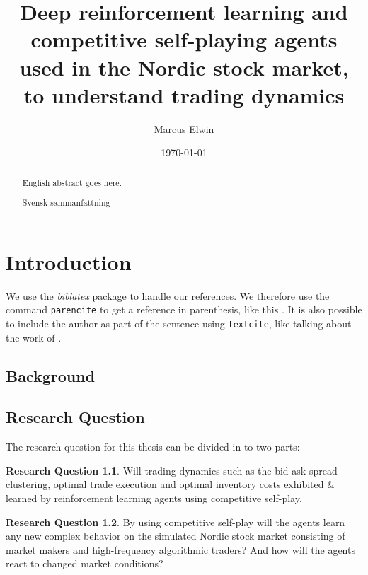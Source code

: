 \documentclass{kththesis}
\title{Deep reinforcement learning and competitive self-playing agents used in the Nordic stock market, to understand trading dynamics}
\author{Marcus Elwin}
\date{\today}
\theoremstyle{definition}
\newtheorem{RQ}{Research Question}[section]
\begin{document}
\frontmatter

\titlepage

\begin{abstract}
  English abstract goes here.

  \blindtext
\end{abstract}


\begin{otherlanguage}{swedish}
  \begin{abstract}
    Svensk sammanfattning
  \end{abstract}
\end{otherlanguage}


\tableofcontents


\mainmatter


\chapter{Introduction}

We use the \emph{biblatex} package to handle our references.  We therefore use the
command \texttt{parencite} to get a reference in parenthesis, like this
\parencite{heisenberg2015}.  It is also possible to include the author
as part of the sentence using \texttt{textcite}, like talking about
the work of \textcite{einstein2016}.

\section{Background}

\section{Research Question}
The research question for this thesis can be divided in to two parts:

\begin{RQ}
Will trading dynamics such as the bid-ask spread clustering, optimal trade execution and optimal inventory costs exhibited \& learned by reinforcement learning agents using competitive self-play.
\end{RQ}

\begin{RQ}
By using competitive self-play will the agents learn any new complex behavior on the simulated Nordic stock market consisting of market makers and high-frequency algorithmic traders? And how will the agents react to changed market conditions?
\end{RQ}
\end{document}

